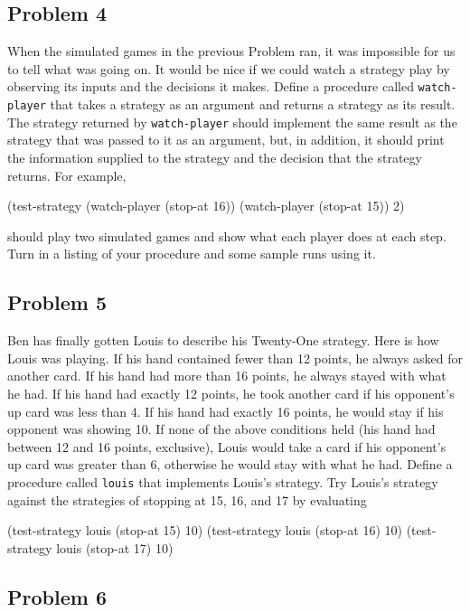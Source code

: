 \subsection{Problem 4}

When the simulated games in the previous Problem ran, it was
impossible for us to tell what was going on.  It would be nice if we
could watch a strategy play by observing its inputs and the decisions
it makes.  Define a procedure called {\tt watch-player} that takes a
strategy as an argument and returns a strategy as its result.  The
strategy returned by {\tt watch-player} should implement the same
result as the strategy that was passed to it as an argument, but, in
addition, it should print the information supplied to the strategy and
the decision that the strategy returns.  For example,

\beginlisp
(test-strategy (watch-player (stop-at 16))
               (watch-player (stop-at 15))
               2)
\endlisp

\noindent
should play two simulated games and show what each player does at each step.
Turn in a listing of your procedure and some sample runs using it.

\subsection{Problem 5}

Ben has finally gotten Louis to describe his Twenty-One strategy.
Here is how Louis was playing.  If his hand contained fewer than 12
points, he always asked for another card.  If his hand had more than
16 points, he always stayed with what he had.  If his hand had exactly
12 points, he took another card if his opponent's up card was less
than 4.  If his hand had exactly 16 points, he would stay if his
opponent was showing 10.  If none of the above conditions held (his
hand had between 12 and 16 points, exclusive), Louis would take a card
if his opponent's up card was greater than 6, otherwise he would stay
with what he had.  Define a procedure called {\tt louis} that
implements Louis's strategy.  Try Louis's strategy against the
strategies of stopping at 15, 16, and 17 by evaluating

\beginlisp
(test-strategy louis (stop-at 15) 10)
(test-strategy louis (stop-at 16) 10)
(test-strategy louis (stop-at 17) 10)
\endlisp

\subsection{Problem 6}

